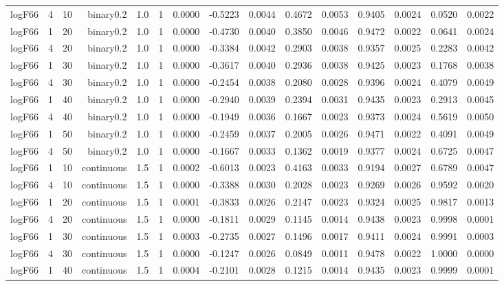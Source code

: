 \begin{longtable}{rrrrrrrrrrrrrrr}
  logF66 & 4 & 10 & binary0.2 & 1.0 & 1 & 0.0000 & -0.5223 & 0.0044 & 0.4672 & 0.0053 & 0.9405 & 0.0024 & 0.0520 & 0.0022 \\ 
  logF66 & 1 & 20 & binary0.2 & 1.0 & 1 & 0.0000 & -0.4730 & 0.0040 & 0.3850 & 0.0046 & 0.9472 & 0.0022 & 0.0641 & 0.0024 \\ 
  logF66 & 4 & 20 & binary0.2 & 1.0 & 1 & 0.0000 & -0.3384 & 0.0042 & 0.2903 & 0.0038 & 0.9357 & 0.0025 & 0.2283 & 0.0042 \\ 
  logF66 & 1 & 30 & binary0.2 & 1.0 & 1 & 0.0000 & -0.3617 & 0.0040 & 0.2936 & 0.0038 & 0.9425 & 0.0023 & 0.1768 & 0.0038 \\ 
  logF66 & 4 & 30 & binary0.2 & 1.0 & 1 & 0.0000 & -0.2454 & 0.0038 & 0.2080 & 0.0028 & 0.9396 & 0.0024 & 0.4079 & 0.0049 \\ 
  logF66 & 1 & 40 & binary0.2 & 1.0 & 1 & 0.0000 & -0.2940 & 0.0039 & 0.2394 & 0.0031 & 0.9435 & 0.0023 & 0.2913 & 0.0045 \\ 
  logF66 & 4 & 40 & binary0.2 & 1.0 & 1 & 0.0000 & -0.1949 & 0.0036 & 0.1667 & 0.0023 & 0.9373 & 0.0024 & 0.5619 & 0.0050 \\ 
  logF66 & 1 & 50 & binary0.2 & 1.0 & 1 & 0.0000 & -0.2459 & 0.0037 & 0.2005 & 0.0026 & 0.9471 & 0.0022 & 0.4091 & 0.0049 \\ 
  logF66 & 4 & 50 & binary0.2 & 1.0 & 1 & 0.0000 & -0.1667 & 0.0033 & 0.1362 & 0.0019 & 0.9377 & 0.0024 & 0.6725 & 0.0047 \\ 
  logF66 & 1 & 10 & continuous & 1.5 & 1 & 0.0002 & -0.6013 & 0.0023 & 0.4163 & 0.0033 & 0.9194 & 0.0027 & 0.6789 & 0.0047 \\ 
  logF66 & 4 & 10 & continuous & 1.5 & 1 & 0.0000 & -0.3388 & 0.0030 & 0.2028 & 0.0023 & 0.9269 & 0.0026 & 0.9592 & 0.0020 \\ 
  logF66 & 1 & 20 & continuous & 1.5 & 1 & 0.0001 & -0.3833 & 0.0026 & 0.2147 & 0.0023 & 0.9324 & 0.0025 & 0.9817 & 0.0013 \\ 
  logF66 & 4 & 20 & continuous & 1.5 & 1 & 0.0000 & -0.1811 & 0.0029 & 0.1145 & 0.0014 & 0.9438 & 0.0023 & 0.9998 & 0.0001 \\ 
  logF66 & 1 & 30 & continuous & 1.5 & 1 & 0.0003 & -0.2735 & 0.0027 & 0.1496 & 0.0017 & 0.9411 & 0.0024 & 0.9991 & 0.0003 \\ 
  logF66 & 4 & 30 & continuous & 1.5 & 1 & 0.0000 & -0.1247 & 0.0026 & 0.0849 & 0.0011 & 0.9478 & 0.0022 & 1.0000 & 0.0000 \\ 
  logF66 & 1 & 40 & continuous & 1.5 & 1 & 0.0004 & -0.2101 & 0.0028 & 0.1215 & 0.0014 & 0.9435 & 0.0023 & 0.9999 & 0.0001 \\ 

\end{longtable}
